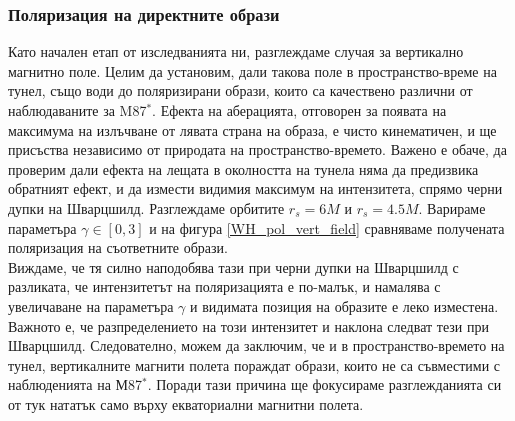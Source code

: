 \subsubsection{Поляризация на директните образи}
Като начален етап от изследванията ни, разглеждаме случая за вертикално магнитно поле. Целим да установим, дали такова поле в пространство-време на тунел, също води до поляризирани образи, които са качествено различни от наблюдаваните за M87$^*$. Ефекта на аберацията, отговорен за появата на максимума на излъчване от лявата страна на образа, е чисто кинематичен, и ще присъства независимо от природата на пространство-времето. Важено е обаче, да проверим дали ефекта на лещата в околността на тунела няма да предизвика обратният ефект, и да измести видимия максимум на интензитета, спрямо черни дупки на Шварцшилд. Разглеждаме орбитите $r_s = 6M$ и $r_s = 4.5M$. Варираме параметъра $\gamma\in[0,3]$ и на фигура \ref{WH_pol_vert_field} сравняваме получената поляризация на съответните образи.\\

Виждаме, че тя силно наподобява тази при черни дупки на Шварцшилд с разликата, че интензитетът на поляризацията е по-малък, и намалява с увеличаване на параметъра $\gamma$ и видимата позиция на образите е леко изместена. Важното е, че разпределението на този интензитет и наклона следват тези при Шварцшилд. Следователно, можем да заключим, че и в пространство-времето на тунел, вертикалните магнити полета пораждат образи, които не са съвместими с наблюденията на М87$^*$. Поради тази причина ще фокусираме разглежданията си от тук нататък само върху екваториални магнитни полета. \newpage

